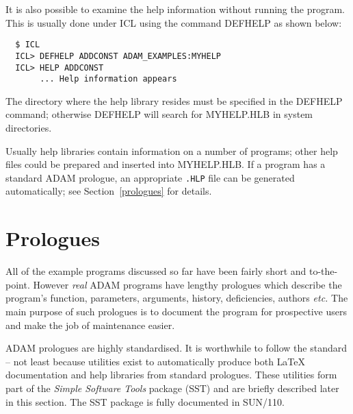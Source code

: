 \documentclass[twoside,11pt]{article}
\renewcommand{\_}{{\tt\char'137}}
\newcommand{\xref}[3]{#1}
\newcommand{\xlabel}[1]{}
\begin{document}
It is also possible to examine the help information without running the 
program. This is usually done under ICL using the command DEFHELP as 
shown below:
\begin{verbatim}
  $ ICL
  ICL> DEFHELP ADDCONST ADAM_EXAMPLES:MYHELP   
  ICL> HELP ADDCONST
       ... Help information appears
\end{verbatim}
The directory where the help library resides must be specified in the
DEFHELP command; otherwise 
DEFHELP will search for MYHELP.HLB in system directories.

Usually help libraries contain information on a number of programs;
other help files could be prepared and inserted into MYHELP.HLB.
If a program has a standard ADAM prologue, 
an appropriate {\tt .HLP} file can be generated automatically; see 
Section~\ref{prologues} for details.

\newpage
\section{Prologues\label{prologues}\xlabel{prologues}}

All of the example programs discussed so far have been fairly short and 
to-the-point.
However {\sl real\/} ADAM programs have lengthy prologues which describe
the program's function, parameters, arguments, history, deficiencies, authors 
{\it etc.}
The main purpose of such prologues is to document the program for 
prospective users and make the job of maintenance easier.

ADAM prologues are highly standardised. It is worthwhile to follow the
standard -- 
not least because utilities exist to automatically produce
both {\LaTeX} documentation and help libraries from standard prologues. 
These utilities form part
of the {\sl Simple Software Tools\/} package  (SST) and are briefly described 
later in this section. The SST package is fully documented in
\xref{SUN/110}{sun110}{}. 
\end{document}
